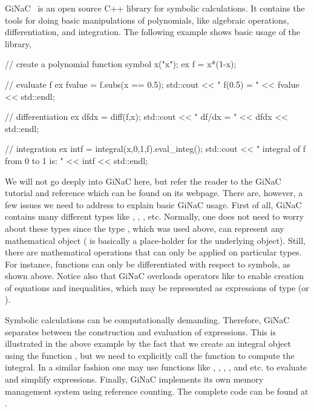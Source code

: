 GiNaC~\citep{BauerFrinkKreckel2000} is an open source C++ library for symbolic calculations. 
It contains the tools for doing basic manipulations of polynomials, like algebraic operations, 
differentiation, and integration. 
The following example shows basic usage of the library,  
\begin{c++}
  // create a polynomial function
  symbol x("x");
  ex f = x*(1-x);

  // evaluate f
  ex fvalue = f.subs(x == 0.5);
  std::cout << " f(0.5) = " << fvalue << std::endl;

  // differentiation
  ex dfdx  = diff(f,x);
  std::cout << " df/dx = " << dfdx << std::endl;

  // integration
  ex intf  = integral(x,0,1,f).eval_integ();
  std::cout << " integral of f from 0 to 1 is: " << intf << std::endl;
\end{c++}
We will not go deeply into GiNaC here, but refer the reader to the 
GiNaC tutorial and reference which can be found on its webpage. There are, however, a few
issues we need to address to explain basic GiNaC usage. First of all, GiNaC 
contains many different types like , , , etc. 
Normally, one does not need to worry about these types since the type , which
was used above, can represent any mathematical object ( is basically a place-holder for the underlying 
object). Still, there are mathematical operations that can only be applied on particular 
types. For instance, functions can only be  differentiated with respect to
symbols, as shown above.  Notice also that GiNaC overloads operators
like \emp{==} to enable creation of equations and inequalities, which
may be represented as  expressions of type  (or ). 

Symbolic calculations can be computationally demanding. Therefore, GiNaC separates between 
the construction and evaluation of expressions. This is illustrated in the above example by
the fact that we create an integral object using the function , but we 
need to explicitly call the function  to compute the integral. In a similar
fashion one may use functions like , , , , 
and    etc. to evaluate and simplify expressions. 
Finally, GiNaC implements its own memory management system using reference counting.   
The complete code can be found at .

